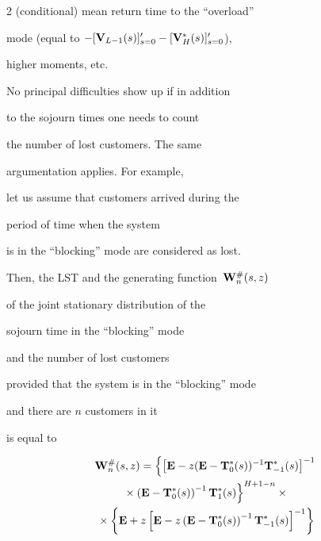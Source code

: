 \begin{multicols}{2}
(conditional) mean return time to the ``overload'' 


mode (equal to $-[\mathbf{V}_{L-1}(s)]'_{s=0}- [\mathbf{V}^*_H(s)]'_{s=0}$),


higher moments, etc.





No principal difficulties show up if in addition 


to the sojourn times one needs to count 


the number of lost customers. The same


argumentation applies. For example, 


let us assume that customers arrived during the


period of time when the system 


is in the ``blocking'' mode are considered as lost.


Then, the LST and the generating function~$\mathbf{W}^{\#}_n(s,z)$


of the joint stationary distribution of the 


sojourn time in the ``blocking'' mode 


and the number of lost customers 


provided that the system is in the ``blocking'' mode 


and there are $n$ customers in it 


is equal to 


\begin{multline*}


\bmx{W}^{\#}_n(s,z)


=  \left \{


\left[ \bmx{E} - z ( \bmx{E}-\bmx{T}^*_0(s))^{-1}\bmx{T}^*_{-1}(s) \right]^{-1}\right.\\


\left.{}\times


\left( \bmx{E}-\bmx{T}^*_0(s)\right)^{-1}\bmx{T}^*_{1}(s)


\right \}^{H+1-n}


\times{} \\


{}\times


\left \{ \bmx{E} +  


z \left[ \bmx{E} - z \left( \bmx{E}-\bmx{T}^*_0(s)\right)^{-1}


\bmx{T}^*_{-1}(s) \right]^{-1}


\right \}\\



\end{multline*}
\end{multicols}
